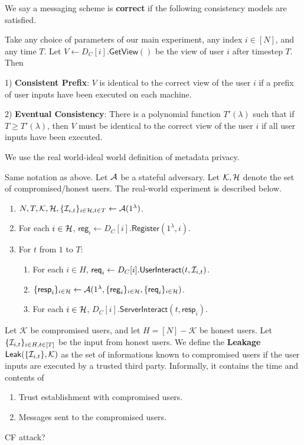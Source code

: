 \documentclass{article}
\newcommand{\reg}{\mathsf{reg}}
\newcommand{\req}{\mathsf{req}}
\newcommand{\resp}{\mathsf{resp}}
\newcommand{\cK}{\mathcal{K}}
\begin{document}
\begin{definition}[Correctness]
 We say a messaging scheme is \textbf{correct} if the following consistency models are satisfied. 
 
 Take any choice of parameters of our main experiment, any index $i \in [N]$, and any time $T$. Let $V \leftarrow D_C[i].\mathsf{GetView}()$ be the view of user $i$ after timestep $T$. Then

1) \textbf{Consistent Prefix}: $V$ is identical to the correct view of the user $i$ if a prefix of user inputs have been executed on each machine.

2) \textbf{Eventual Consistency}: There is a polynomial function $T'(\lambda)$ such that if $T \geq T'(\lambda)$, then $V$ must be identical to the correct view of the user $i$ if all user inputs have been executed.

\end{definition}
We use the real world-ideal world definition of metadata privacy.
\begin{definition}
Same notation as above. Let $\mathcal A$ be a stateful adversary. Let $\cK, \cH$ denote the set of compromised/honest users. The real-world experiment is described below.
\begin{enumerate}
\item $N, T, \cK, \cH, \{\cI_{i, t}\}_{i \in \cH, t \in T} \leftarrow \cA(1^{\lambda})$.
\item For each $i \in \mathcal H$, $\reg_i \leftarrow D_C[i].\mathsf{Register}(1^{\lambda}, i)$. 
\item For $t$ from $1$ to $T$:
    \begin{enumerate}
    \item For each $i \in H$, $\req_i \leftarrow D_C[i].\mathsf{UserInteract}(t, \cI_{i, t})$.
    
    \item $\{\resp_i\}_{i \in \cH} \leftarrow \cA(1^{\lambda}, \{\reg_i\}_{i \in \cH}, \{\req_i\}_{i \in \cH})$.
    
    \item For each $i \in \mathcal H$, $D_C[i].\mathsf{ServerInteract}(t, \resp_i)$.
    \end{enumerate}
\end{enumerate}
\end{definition}
\begin{definition}[Leakage]
Let $\cK$ be compromised users, and let $H = [N] - \cK$ be honest users. Let $\{\mathcal I_{i, t}\}_{i \in H, t \in [T]}$ be the input from honest users. We define the \textbf{Leakage} $\mathsf{Leak}(\{\cI_{i, t}\}, \cK)$ as the set of informations known to compromised users if the user inputs are executed by a trusted third party. Informally, it contains the time and contents of
\begin{enumerate}
    \item Trust establishment with compromised users.
    \item Messages sent to the compromised users.
\end{enumerate}
CF attack?
\end{definition}
\end{document}
